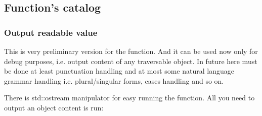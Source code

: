\documentclass[a4paper]{article}
\begin{document}
\begin{comment}
	private:
		Employee empl_;

		TRAVERSABLE(PersonUnit,p.empl_)
	};

	struct Dept {
		Name& name() { return name_; }
		Manager& manager() { return manager_; }
		std::list<boost::shared_ptr<SubUnit> >& subUnits() { return subUnits_; }

		Name const& name() const { return name_; }
		Manager const& manager() const { return manager_; }
		std::list<boost::shared_ptr<SubUnit> > const& subUnits() const { return subUnits_; }

	private:
		Name name_;
		Manager manager_;
		std::list<boost::shared_ptr<SubUnit> > subUnits_;
	};

	//NOTE: you will have to have const and not const options for accessors
	// the definition should be in qx namespace
	TRAVERSABLE_OUTER(Dept,p.name() << p.manager() << p.subUnits());

	struct DeptUnit:SubUnit {
		Dept dept() { return dept_; }
	private:
		Dept dept_;
		float salary_;

		ACCEPTABLE_CHILD(SubUnit);
		TRAVERSABLE(DeptUnit, p.dept_ << alias<Salary>(p.salary_));
	};

	//NOTE: encapsulation is broken

	struct Company {
		std::list<Dept>& depts() { return depts_; }
	private:
		std::list<Dept> depts_;
		TRAVERSABLE(Company,p.depts_)
	};

\end{lstlisting}

\end{comment}

\subsection{Function's catalog}

\subsubsection{Output readable value}

This is very preliminary version for the function. And it can be used now only for debug
purposes, i.e. output content of any traversable object. In future here must be done
at least punctuation handling and at most some natural language grammar handling i.e.
plural/singular forms, cases handling and so on.

There is std::ostream manipulator for easy running the function. All you need to output
an object content is run:
\end{document}
